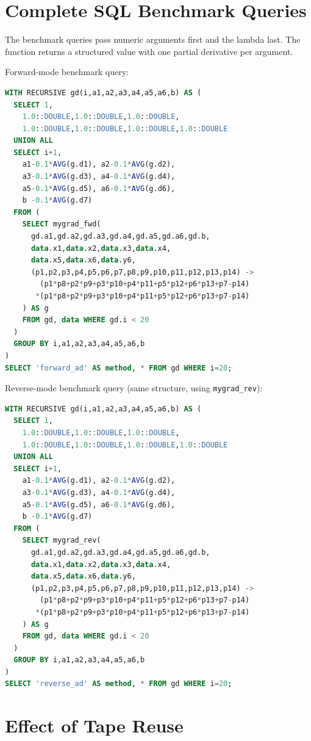 \documentclass[12pt]{report}
\begin{document}
\section{Complete SQL Benchmark Queries}

The benchmark queries pass numeric arguments first and the lambda last.
The function returns a structured value with one partial derivative per
argument.

Forward-mode benchmark query:

\begin{lstlisting}[language=SQL]
WITH RECURSIVE gd(i,a1,a2,a3,a4,a5,a6,b) AS (
  SELECT 1,
    1.0::DOUBLE,1.0::DOUBLE,1.0::DOUBLE,
    1.0::DOUBLE,1.0::DOUBLE,1.0::DOUBLE,1.0::DOUBLE
  UNION ALL
  SELECT i+1,
    a1-0.1*AVG(g.d1), a2-0.1*AVG(g.d2),
    a3-0.1*AVG(g.d3), a4-0.1*AVG(g.d4),
    a5-0.1*AVG(g.d5), a6-0.1*AVG(g.d6),
    b -0.1*AVG(g.d7)
  FROM (
    SELECT mygrad_fwd(
      gd.a1,gd.a2,gd.a3,gd.a4,gd.a5,gd.a6,gd.b,
      data.x1,data.x2,data.x3,data.x4,
      data.x5,data.x6,data.y6,
      (p1,p2,p3,p4,p5,p6,p7,p8,p9,p10,p11,p12,p13,p14) ->
        (p1*p8+p2*p9+p3*p10+p4*p11+p5*p12+p6*p13+p7-p14)
       *(p1*p8+p2*p9+p3*p10+p4*p11+p5*p12+p6*p13+p7-p14)
    ) AS g
    FROM gd, data WHERE gd.i < 20
  )
  GROUP BY i,a1,a2,a3,a4,a5,a6,b
)
SELECT 'forward_ad' AS method, * FROM gd WHERE i=20;
\end{lstlisting}

Reverse-mode benchmark query (same structure, using
\texttt{mygrad\_rev}):

\begin{lstlisting}[language=SQL]
WITH RECURSIVE gd(i,a1,a2,a3,a4,a5,a6,b) AS (
  SELECT 1,
    1.0::DOUBLE,1.0::DOUBLE,1.0::DOUBLE,
    1.0::DOUBLE,1.0::DOUBLE,1.0::DOUBLE,1.0::DOUBLE
  UNION ALL
  SELECT i+1,
    a1-0.1*AVG(g.d1), a2-0.1*AVG(g.d2),
    a3-0.1*AVG(g.d3), a4-0.1*AVG(g.d4),
    a5-0.1*AVG(g.d5), a6-0.1*AVG(g.d6),
    b -0.1*AVG(g.d7)
  FROM (
    SELECT mygrad_rev(
      gd.a1,gd.a2,gd.a3,gd.a4,gd.a5,gd.a6,gd.b,
      data.x1,data.x2,data.x3,data.x4,
      data.x5,data.x6,data.y6,
      (p1,p2,p3,p4,p5,p6,p7,p8,p9,p10,p11,p12,p13,p14) ->
        (p1*p8+p2*p9+p3*p10+p4*p11+p5*p12+p6*p13+p7-p14)
       *(p1*p8+p2*p9+p3*p10+p4*p11+p5*p12+p6*p13+p7-p14)
    ) AS g
    FROM gd, data WHERE gd.i < 20
  )
  GROUP BY i,a1,a2,a3,a4,a5,a6,b
)
SELECT 'reverse_ad' AS method, * FROM gd WHERE i=20;
\end{lstlisting}

\section{Effect of Tape Reuse}
\end{document}
